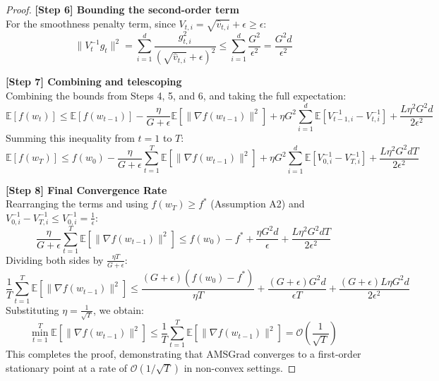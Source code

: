 \documentclass{article}
\begin{document}
\begin{proof}
\textbf{[Step 6] Bounding the second-order term} \\
For the smoothness penalty term, since $V_{t,i} = \sqrt{\hat{v}_{t,i}} + \epsilon \ge \epsilon$:
\[ \|V_t^{-1} g_t\|^2 = \sum_{i=1}^d \frac{g_{t,i}^2}{(\sqrt{\hat{v}_{t,i}} + \epsilon)^2} \le \sum_{i=1}^d \frac{G^2}{\epsilon^2} = \frac{G^2 d}{\epsilon^2} \]

\textbf{[Step 7] Combining and telescoping} \\
Combining the bounds from Steps 4, 5, and 6, and taking the full expectation:
\[ \mathbb{E}[f(w_t)] \le \mathbb{E}[f(w_{t-1})] - \frac{\eta}{G + \epsilon} \mathbb{E}[\|\nabla f(w_{t-1})\|^2] + \eta G^2 \sum_{i=1}^d \mathbb{E}[V_{t-1,i}^{-1} - V_{t,i}^{-1}] + \frac{L \eta^2 G^2 d}{2 \epsilon^2} \]
Summing this inequality from $t=1$ to $T$:
\[ \mathbb{E}[f(w_T)] \le f(w_0) - \frac{\eta}{G + \epsilon} \sum_{t=1}^T \mathbb{E}[\|\nabla f(w_{t-1})\|^2] + \eta G^2 \sum_{i=1}^d \mathbb{E}[V_{0,i}^{-1} - V_{T,i}^{-1}] + \frac{L \eta^2 G^2 d T}{2 \epsilon^2} \]

\textbf{[Step 8] Final Convergence Rate} \\
Rearranging the terms and using $f(w_T) \ge f^*$ (Assumption A2) and $V_{0,i}^{-1} - V_{T,i}^{-1} \le V_{0,i}^{-1} = \frac{1}{\epsilon}$:
\[ \frac{\eta}{G + \epsilon} \sum_{t=1}^T \mathbb{E}[\|\nabla f(w_{t-1})\|^2] \le f(w_0) - f^* + \frac{\eta G^2 d}{\epsilon} + \frac{L \eta^2 G^2 d T}{2 \epsilon^2} \]
Dividing both sides by $\frac{\eta T}{G + \epsilon}$:
\[ \frac{1}{T} \sum_{t=1}^T \mathbb{E}[\|\nabla f(w_{t-1})\|^2] \le \frac{(G + \epsilon)(f(w_0) - f^*)}{\eta T} + \frac{(G + \epsilon) G^2 d}{\epsilon T} + \frac{(G + \epsilon) L \eta G^2 d}{2 \epsilon^2} \]
Substituting $\eta = \frac{1}{\sqrt{T}}$, we obtain:
\[ \min_{t=1}^T \mathbb{E}[\|\nabla f(w_{t-1})\|^2] \le \frac{1}{T} \sum_{t=1}^T \mathbb{E}[\|\nabla f(w_{t-1})\|^2] = \mathcal{O}\left(\frac{1}{\sqrt{T}}\right) \]
This completes the proof, demonstrating that AMSGrad converges to a first-order stationary point at a rate of $\mathcal{O}(1/\sqrt{T})$ in non-convex settings.
\end{proof}
\end{document}

